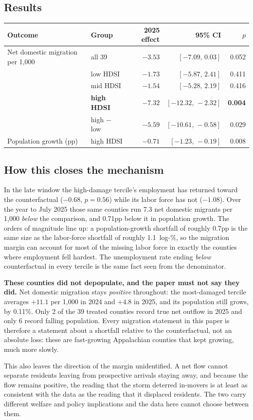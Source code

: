 \documentclass[11pt,a4paper]{article}
\newcommand{\lp}{log-\%}
\begin{document}
\subsection{Results}
\begin{center}\small
\begin{tabular}{llrrr}
\toprule
Outcome & Group & 2025 effect & 95\% CI & $p$ \\
\midrule
Net domestic migration per 1{,}000 & all 39 & $-3.53$ & $[-7.09,\,0.03]$ & 0.052\\
 & low HDSI & $-1.73$ & $[-5.87,\,2.41]$ & 0.411\\
 & mid HDSI & $-1.54$ & $[-5.28,\,2.19]$ & 0.416\\
 & \textbf{high HDSI} & $\mathbf{-7.32}$ & $[-12.32,\,-2.32]$ & \textbf{0.004}\\
 & high $-$ low & $-5.59$ & $[-10.61,\,-0.58]$ & 0.029\\
Population growth (pp) & high HDSI & $-0.71$ & $[-1.23,\,-0.19]$ & 0.008\\
\bottomrule
\end{tabular}
\end{center}

\subsection{How this closes the mechanism}
In the late window the high-damage tercile's employment has returned toward the counterfactual
($-0.68$, $p=0.56$) while its labor force has not ($-1.08$). Over the year to July 2025 those same
counties run 7.3 net domestic migrants per 1{,}000 \emph{below} the comparison, and 0.71pp below it in
population growth. The orders of magnitude line up: a population-growth shortfall of roughly 0.7pp is
the same size as the labor-force shortfall of roughly 1.1~\lp, so the migration margin can account for
most of the missing labor force in exactly the counties where employment fell hardest. The unemployment
rate ending \emph{below} counterfactual in every tercile is the same fact seen from the denominator.

\begin{plainbox}
\textbf{These counties did not depopulate, and the paper must not say they did.} Net domestic migration
stays \emph{positive} throughout: the most-damaged tercile averages $+11.1$ per 1{,}000 in 2024 and
$+4.8$ in 2025, and its population still grows, by 0.11\%. Only 2 of the 39 treated counties record true
net outflow in 2025 and only 6 record falling population. Every migration statement in this paper is
therefore a statement about a shortfall relative to the counterfactual, not an absolute loss: these are
fast-growing Appalachian counties that kept growing, much more slowly.

This also leaves the direction of the margin unidentified. A net flow cannot separate residents leaving
from prospective arrivals staying away, and because the flow remains positive, the reading that the
storm deterred in-movers is at least as consistent with the data as the reading that it displaced
residents. The two carry different welfare and policy implications and the data here cannot choose
between them.
\end{plainbox}
\end{document}
